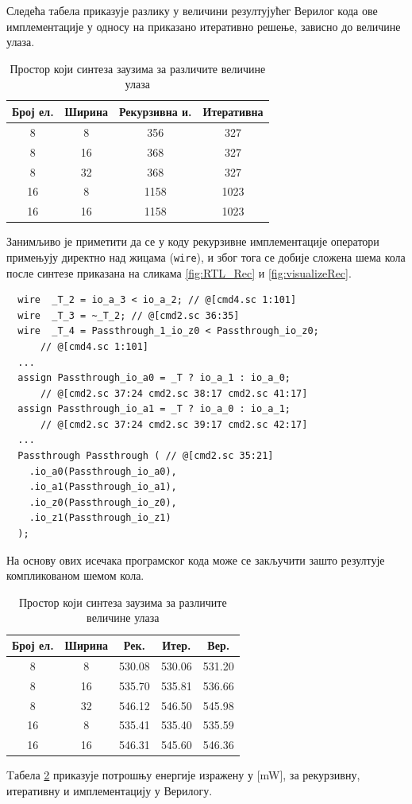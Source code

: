 \documentclass[12pt, a4paper]{article}
\theoremstyle{definition}
\begin{document}
Следећа табела приказује разлику у величини резултујућег Верилог кода ове имплементације у односу на приказано итеративно решење, зависно до величине улаза.

\begin{table}[H]
\centering
 \begin{tabular}{| c | c | c c |}
  \hline
  Број ел. & Ширина & Рекурзивна и. & Итеративна \\
  \hline
  8 & 8  & 356 & 327 \\
  8 & 16 & 368 & 327 \\
  8 & 32 & 368 & 327 \\
  \hline
  16 & 8 & 1158 & 1023 \\
  16 & 16 & 1158 & 1023 \\
  \hline
 \end{tabular}
 \caption{Простор који синтеза заузима за различите величине улаза}
 \label{tab:brojLinija}
\end{table}

Занимљиво је приметити да се у коду рекурзивне имплементације оператори примењују директно над жицама (\verb+wire+), и због тога се добије сложена шема кола после синтезе приказана на сликама \ref{fig:RTL_Rec} и \ref{fig:visualizeRec}.

\begin{verbatim}
  wire  _T_2 = io_a_3 < io_a_2; // @[cmd4.sc 1:101]
  wire  _T_3 = ~_T_2; // @[cmd2.sc 36:35]
  wire  _T_4 = Passthrough_1_io_z0 < Passthrough_io_z0;
      // @[cmd4.sc 1:101]
  ...
  assign Passthrough_io_a0 = _T ? io_a_1 : io_a_0;
      // @[cmd2.sc 37:24 cmd2.sc 38:17 cmd2.sc 41:17]
  assign Passthrough_io_a1 = _T ? io_a_0 : io_a_1;
      // @[cmd2.sc 37:24 cmd2.sc 39:17 cmd2.sc 42:17]
  ...
  Passthrough Passthrough ( // @[cmd2.sc 35:21]
    .io_a0(Passthrough_io_a0),
    .io_a1(Passthrough_io_a1),
    .io_z0(Passthrough_io_z0),
    .io_z1(Passthrough_io_z1)
  );
\end{verbatim}

На основу ових исечака програмског кода може се закључити зашто резултује компликованом шемом кола.
\begin{table}[H]
\centering
 \begin{tabular}{| c | c | c c c |}
  \hline
  Број ел. & Ширина & Рек. & Итер. & Вер. \\
  \hline
  8 & 8  & 530.08 & 530.06 & 531.20 \\
  8 & 16 & 535.70 & 535.81 & 536.66 \\
  8 & 32 & 546.12 & 546.50 & 545.98 \\
  \hline
  16 & 8 & 535.41 & 535.40 & 535.59 \\
  16 & 16 & 546.31 & 545.60 & 546.36 \\
  \hline
 \end{tabular}
 \caption{Простор који синтеза заузима за различите величине улаза}
 \label{tab:potrosnja}
\end{table}
Tабела \ref{tab:potrosnja} приказује потрошњу енергије изражену у [mW], за рекурзивну, итеративну и имплементацију у Верилогу.
\end{document}
